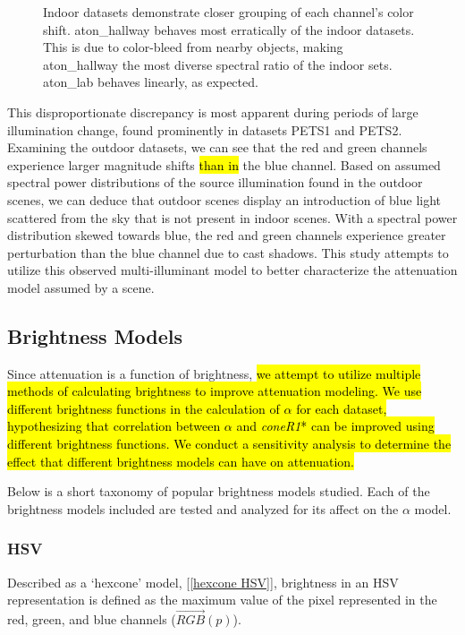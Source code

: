 \documentclass[12pt]{report}
\begin{document}
\begin{figure}
\caption{Indoor datasets demonstrate closer grouping of each channel's color shift. aton\_hallway behaves most erratically of the indoor datasets. This is due to color-bleed from nearby objects, making aton\_hallway the most diverse spectral ratio of the indoor sets. aton\_lab behaves linearly, as expected.}
\label{fig:rgshift_indoor}
\end{figure}

This disproportionate discrepancy is most apparent during periods of large illumination change, found prominently in datasets PETS1 and PETS2. Examining the outdoor datasets, we can see that the red and green channels experience larger magnitude shifts \hl{than in} the blue channel. Based on assumed spectral power distributions of the source illumination found in the outdoor scenes, we can deduce that outdoor scenes display an introduction of blue light scattered from the sky that is not present in indoor scenes. With a spectral power distribution skewed towards blue, the red and green channels experience greater perturbation than the blue channel due to cast shadows. This study attempts to utilize this observed multi-illuminant model to better characterize the attenuation model assumed by a scene. 

\subsection{Brightness Models} \label{section:brightnessmodels}

Since attenuation is a function of brightness, \hl{we attempt to utilize multiple methods of calculating brightness to improve attenuation modeling. We use different brightness functions in the calculation of $\alpha$ for each dataset, hypothesizing that correlation between $\alpha$ and \textit{coneR1}* can be improved using different brightness functions. We conduct a sensitivity analysis to determine the effect that different brightness models can have on attenuation.} 

Below is a short taxonomy of popular brightness models studied. Each of the brightness models included are tested and analyzed for its affect on the $\alpha$ model.

\subsubsection{HSV}

Described as a `hexcone' model, [\ref{hexcone HSV}], brightness in an HSV representation is defined as the maximum value of the pixel represented in the red, green, and blue channels ($\vec{RGB}(p)$).
\end{document}
